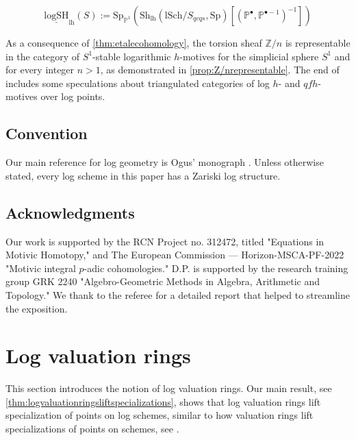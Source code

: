 \documentclass[10pt]{amsart}
\DeclareRobustCommand{\SkipTocEntry}[5]{}
\newcommand{\lh}{\mathrm{lh}}
\newcommand{\Sh}{\mathrm{Sh}}
\newcommand{\Sp}{\mathrm{Sp}}
\newcommand{\lSch}{\mathrm{lSch}}
\newcommand{\logSH}{\mathrm{logSH}}
\begin{document}
\[
\underline{\logSH}_{\lh}(S) := \Sp_{\mathbb{P}^1}(\Sh_{\lh}(\lSch/S_{qcqs},\Sp)[(\mathbb{P}^\bullet,\mathbb{P}^{\bullet-1})^{-1}])
\]

As a consequence of \cref{thm:etalecohomology}, the torsion sheaf \( \mathbb{Z}/n \) is representable in the category of \( S^1 \)-stable logarithmic \( h \)-motives for the simplicial sphere \( S^1 \) and for every integer \( n > 1 \), as demonstrated in \cref{prop:Z/nrepresentable}.
The end of  includes some speculations about triangulated categories of log \( h \)- and \( qfh \)-motives over log points.

\subsection*{Convention}
Our main reference for log geometry is Ogus' monograph \cite{Ogu}. Unless otherwise stated, every log scheme in this paper has a Zariski log structure.

\subsection*{Acknowledgments}
Our work is supported by the RCN Project no. 312472, titled "Equations in Motivic Homotopy," and The European Commission — Horizon-MSCA-PF-2022 "Motivic integral \( p \)-adic cohomologies." D.P. is supported by the research training group GRK 2240 "Algebro-Geometric Methods in Algebra, Arithmetic and Topology."
We thank to the referee for a detailed report that helped to streamline the exposition.















\section{Log valuation rings}
\label{section:Valuative monoids}
This section introduces the notion of log valuation rings. 
Our main result, see \cref{thm:logvaluationringsliftspecializations}, 
shows that log valuation rings lift specialization of points on log schemes, 
similar to how valuation rings lift specializations of points on schemes, 
see \cite[Tag 01J8]{stacks-project}.
\end{document}
